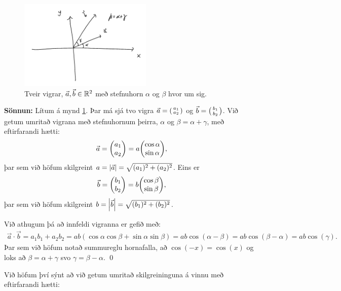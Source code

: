 \ifdefined \wholebook \else\documentclass[oneside]{book}\usepackage{EdlBook}\graphicspath{{figures/}}
\begin{document}
\begin{minipage}{\linewidth}
\begin{figure}
\includegraphics[width=2.5in]{temp/vigrar.png}
\caption{Tveir vigrar, $\vec{a}, \vec{b} \in \mathbb{R}^2$ með stefnuhorn $\alpha$ og $\beta$ hvor um sig.}
\label{fig:ab-innfeldi}
\end{figure}


\textbf{Sönnun:} Lítum á mynd \ref{fig:ab-innfeldi}. Þar má sjá tvo vigra $\vec{a} = \smqty(a_1 \\ a_2)$ og $\vec{b} = \smqty(b_1 \\ b_2)$. Við getum umritað vigrana með stefnuhornum þeirra, $\alpha$ og $\beta = \alpha + \gamma$, með eftirfarandi hætti:
\begin{align*}
    \vec{a} = \mqty(a_1 \\ a_2) = a\mqty(\cos\alpha \\ \sin\alpha),
\end{align*}
þar sem við höfum skilgreint $a = \abs{\vec{a}} = \sqrt{(a_1)^2 + (a_2)^2}$. Eins er
\begin{align*}
    \vec{b} = \mqty(b_1 \\ b_2) = b \mqty(\cos\beta \\ \sin\beta),
\end{align*}
þar sem við höfum skilgreint $b = \abs{\vec{b}} = \sqrt{(b_1)^2 + (b_2)^2}$.
\end{minipage}


Við athugum þá að innfeldi vigranna er gefið með:
\begin{align*}
    \vec{a} \cdot \vec{b} = a_1 b_1 + a_2 b_2 = ab\left( \cos\alpha \cos\beta + \sin\alpha \sin\beta \right) = ab \cos(\alpha - \beta) = ab\cos(\beta - \alpha) = ab\cos(\gamma).
\end{align*}
Þar sem við höfum notað summureglu hornafalla, að $\cos(-x) = \cos(x)$ og loks að $\beta = \alpha + \gamma$ svo $\gamma = \beta - \alpha$. \qed

\newpage

Við höfum því sýnt að við getum umritað skilgreininguna á vinnu með eftirfarandi hætti:
\end{document}
